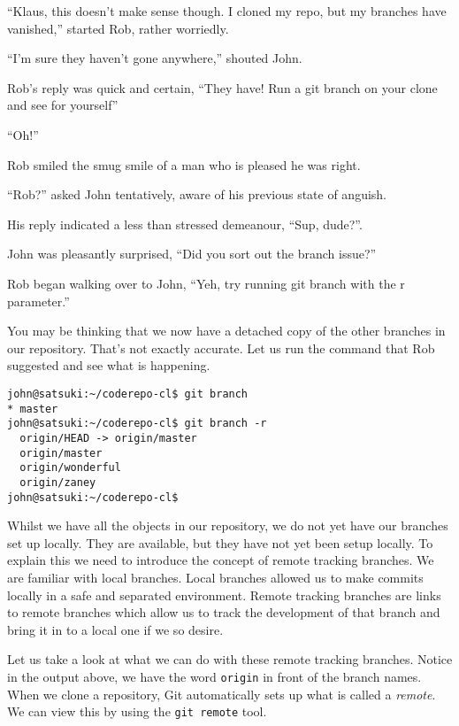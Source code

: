 \begin{trenches}
``Klaus, this doesn't make sense though.  I cloned my repo, but my branches have vanished,'' started Rob, rather worriedly.

``I'm sure they haven't gone anywhere,'' shouted John.  

Rob's reply was quick and certain, ``They have!  Run a git branch on your clone and see for yourself''

``Oh!''

Rob smiled the smug smile of a man who is pleased he was right.

\thoughtbreak

``Rob?'' asked John tentatively, aware of his previous state of anguish.

His reply indicated a less than stressed demeanour, ``Sup, dude?''.

John was pleasantly surprised, ``Did you sort out the branch issue?''

Rob began walking over to John, ``Yeh, try running git branch with the r parameter.''

\end{trenches}

You may be thinking that we now have a detached copy of the other branches in our repository.  That's not exactly accurate.  Let us run the command that Rob suggested and see what is happening.  

\begin{Verbatim}[frame=leftline,framerule=1mm,fontsize=\relsize{-3}] 
john@satsuki:~/coderepo-cl$ git branch
* master
john@satsuki:~/coderepo-cl$ git branch -r
  origin/HEAD -> origin/master
  origin/master
  origin/wonderful
  origin/zaney
john@satsuki:~/coderepo-cl$ 
\end{Verbatim}

Whilst we have all the objects in our repository, we do not yet have our branches set up locally.  They are available, but they have not yet been setup locally.  To explain this we need to introduce the concept of remote tracking branches.  We are familiar with local branches.  Local branches allowed us to make commits locally in a safe and separated environment.  Remote tracking branches are links to remote branches which allow us to track the development of that branch and bring it in to a local one if we so desire.

Let us take a look at what we can do with these remote tracking branches.  Notice in the output above, we have the word \texttt{origin} in front of the branch names.  When we clone a repository, Git automatically sets up what is called a \emph{remote}.  We can view this by using the \texttt{git remote} tool.

